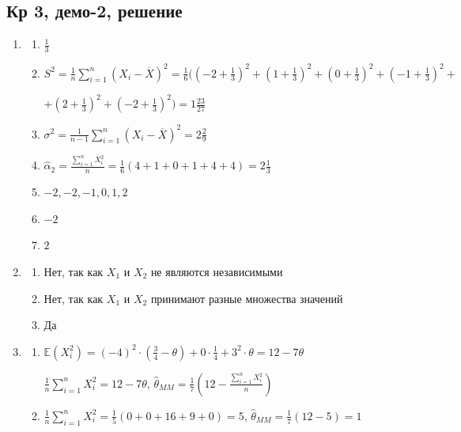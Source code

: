 \documentclass[12pt, a4paper]{article}\usepackage[]{graphicx}\usepackage[]{color}
\begin{document}
\subsection{Кр 3, демо-2, решение}



\begin{enumerate}
	\item 
		\begin{enumerate}
			\item $\frac{1}{3}$
			\item 
					$S^2 = \frac{1}{n} \sum_{i=1}^n (X_i - \overline{X})^2 = \frac{1}{6} ( \left(-2 + \frac{1}{3}\right)^2 + \left(1 + \frac{1}{3} \right)^2 + \left(0 + \frac{1}{3}\right)^2 + \left(-1 + \frac{1}{3}\right)^2 + $
					
					$   + \left(2+ \frac{1}{3}\right)^2 + \left(-2+ \frac{1}{3}\right)^2 ) = 1\frac{23}{27}$
			
			\item $\sigma^2 = \frac{1}{n-1} \sum_{i=1}^n (X_i - \overline{X})^2 =2 \frac{2}{9}$
			\item $\hat{\alpha}_2 = \frac{\sum_{i=1}^n X_i^2}{n} = \frac{1}{6} (4 + 1 + 0 + 1 + 4 + 4) = 2\frac{1}{3}$
			\item $-2, -2, -1, 0, 1, 2$
			\item $-2$
			\item $2$
		\end{enumerate}
		
	\item
		\begin{enumerate}
			\item Нет,  так как $X_1$ и  $X_2$ не являются независимыми
			\item Нет,  так как $X_1$ и  $X_2$ принимают разные множества значений
			\item Да
		\end{enumerate}
		
	\item
		\begin{enumerate}
			\item $\mathbb{E}(X_i^2) = (-4)^2 \cdot \left(\frac{3}{4} - \theta\right) + 0\cdot \frac{1}{4}+ 3^2 \cdot \theta = 12 - 7\theta$
			
			$\frac{1}{n} \sum_{i=1}^n X_i^2 = 12 - 7\theta$, $\hat{\theta}_{MM} = \frac{1}{7} \left(12-\frac{\sum_{i=1}^n X_i^2}{n} \right)$
			\item $\frac{1}{n}\sum_{i=1}^n X_i^2 = \frac{1}{5}(0 + 0 + 16  + 9+ 0) = 5$, $\hat{\theta}_{MM} =\frac{1}{7} (12-5)= 1$
		\end{enumerate}
		

\end{enumerate}
\end{document}
